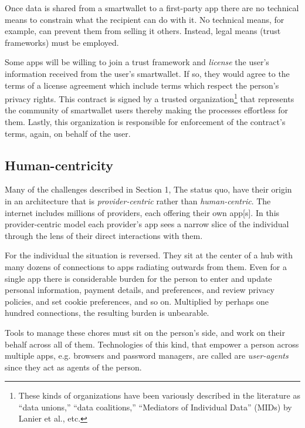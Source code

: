 \documentclass[11pt, oneside]{article}   	%
\begin{document}
Once data is shared from a smartwallet to a first-party app there are no technical means to constrain what the recipient can do with it. No technical means, for example, can prevent them from selling it others. Instead, legal means (trust frameworks) must be employed. 

Some apps will be willing to join a trust framework and \emph{license} the user's information received from the user's smartwallet. If so, they would agree to the terms of a license agreement which include terms which respect the person's privacy rights. This contract is signed by a trusted organization\footnote{These kinds of organizations have been variously described in the literature as ``data unions,'' ``data coalitions,'' ``Mediators of Individual Data'' (MIDs) by Lanier et al.\cite{Lanier2018}, etc.} that represents the community of smartwallet users thereby making the processes effortless for them. Lastly, this organization is responsible for enforcement of the contract's terms, again, on behalf of the user.

\subsection{Human-centricity}

Many of the challenges described in Section 1, The status quo, have their origin in an architecture that is \emph{provider-centric} rather than \emph{human-centric}. The internet includes millions of providers, each offering their own app[s]. In this provider-centric model each provider's app sees a narrow slice of the individual through the lens of their direct interactions with them. 

For the individual the situation is reversed. They sit at the center of a hub with many dozens of connections to apps radiating outwards from them. Even for a single app there is considerable burden for the person to enter and update personal information, payment details, and preferences, and review privacy policies, and set cookie preferences, and so on. Multiplied by perhaps one hundred connections, the resulting burden is unbearable. 

Tools to manage these chores must sit on the person's side, and work on their behalf across all of them. Technologies of this kind, that empower a person across multiple apps, e.g. browsers and password managers, are called are \emph{user-agents} since they act as agents of the person. 
\end{document}
